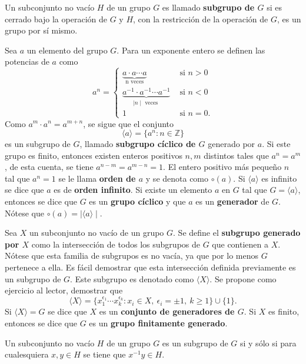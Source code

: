 \begin{definicion}
Un subconjunto no vacío $H$ de un grupo $G$ es llamado \textbf{subgrupo de $G$} si es cerrado bajo la operación de $G$ y $H$, con la restricción de la operación de $G$, es un grupo por sí mismo.
\end{definicion}
\begin{ejemplo}
Sea $a$ un elemento del grupo $G$. Para un exponente entero se definen las potencias de $a$ como
\[ a^n = \left\{ \begin{array}{lr}
\underset{\mbox{n veces}}{\underbrace{a \cdot a \cdots a}} & \mbox{ si } n >0\\
\underset{\mid n \mid \mbox{ veces }}{\underbrace{a^{-1}\cdot a^{-1}\cdots a^{-1}}} & \mbox{ si } n<0 \\
1 & \mbox{ si } n = 0.
\end{array} \right.  \]
Como $a^m \cdot a^n = a^{m+n}$, se sigue que el conjunto
\[\langle a \rangle = \{ a^n : n \in \mathds{Z} \} \]
es un subgrupo de $G$, llamado \textbf{subgrupo cíclico de $G$} generado por $a$.
Si este grupo es finito, entonces existen enteros positivos $n,m$ distintos tales que $a^n = a^m$, de esta cuenta, se tiene $a^{n-m} = a^{m-n} = 1$. El entero positivo más pequeño $n$  tal que $a^n = 1$ se le llama \textbf{orden de $a$} y se denota como $\circ(a)$. Si $\langle a \rangle$ es infinito se dice que $a$ es de \textbf{orden infinito}.
Si existe un elemento $a$ en $G$ tal que $G = \langle a \rangle$, entonces se dice que $G$ es un \textbf{grupo cíclico} y que $a$ es un \textbf{generador} de $G$. Nótese que $\circ(a) = \mid \langle a \rangle \mid $.
\end{ejemplo}
\begin{ejemplo}
Sea $X$ un subconjunto no vacío de un grupo $G$. Se define el \textbf{subgrupo generado por $X$} como la intersección de todos los subgrupos de $G$ que contienen a $X$. Nótese que esta familia de subgrupos es no vacía, ya que por lo menos $G$ pertenece a ella. Es fácil demostrar que esta intersección definida previamente es un subgrupo de $G$. Este subgrupo es denotado como $\langle X \rangle$. Se propone como ejercicio al lector, demostrar que 
\[ \langle X \rangle = \{ x_1^{\epsilon_1} \cdots x_k^{\epsilon_k} \colon x_i \in X, \ \epsilon_i = \pm 1, \ k \geq 1 \} \cup \{1\} .\]
Si $\langle X \rangle = G$ se dice que $X$ es un \textbf{conjunto de generadores de $G$}. Si $X$ es finito, entonces se dice que $G$ es un \textbf{grupo finitamente generado}.
\end{ejemplo}
 \begin{lema}
 Un subconjunto no vacío $H$ de un grupo $G$ es un subgrupo de $G$ si y sólo si para cualesquiera $x,y \in H$ se tiene que $x^{-1}y \in H$.
 \end{lema}
